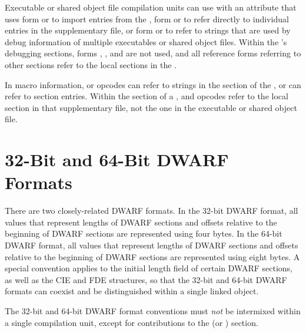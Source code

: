 Executable or shared object file compilation units can use
\DWTAGimportedunit{} with an
\DWATimport{} attribute that uses form \DWFORMrefsupfour{} or \DWFORMrefsupeight{} 
to import entries from the , 
\bb
form \DWFORMrefsupfour{} or \DWFORMrefsupeight{} 
\eb
to refer directly to individual entries in the supplementary file, or
\bb
form \DWFORMstrpsup{} or \DWFORMstrpsupeight{} 
\eb
to refer to strings that are used by debug information of multiple
executables or shared object files.  Within the 's
debugging sections, forms \DWFORMrefsupfour{}, 
\bb
\DWFORMrefsupeight{}, \DWFORMstrpsup{} and \DWFORMstrpsupeight{}
\eb
are not used, and all reference forms referring to \db other sections
refer to the local sections in the .

In macro information, \DWMACROdefinesup{} or
\DWMACROundefsup{} opcodes can refer to strings in the 
\dotdebugstr{} section of the , 
or \DWMACROimportsup{} 
can refer to \dotdebugmacro{} section entries.  Within the 
\dotdebugmacro{} section of a , 
\DWMACROdefinestrp{} and \DWMACROundefstrp{}
opcodes refer to the local \dotdebugstr{} section in that
supplementary file, not the one in
the executable or shared object file.


\section{32-Bit and 64-Bit DWARF Formats}
\label{datarep:32bitand64bitdwarfformats}
\hypertarget{datarep:xxbitdwffmt}{}
There are two closely-related DWARF
formats. In the 32-bit DWARF
format, all values that represent lengths of DWARF sections
and offsets relative to the beginning of DWARF sections are
represented using four bytes. In the 64-bit DWARF format, all
values that represent lengths of DWARF sections and offsets
relative to the beginning of DWARF sections are represented
using eight bytes. A special convention applies to the initial
length field of certain DWARF sections, as well as the CIE and
FDE structures, so that the 32-bit and 64-bit DWARF formats
can coexist and be distinguished within a single linked object.

\bb
The 32-bit and 64-bit DWARF format conventions must \emph{not} be
intermixed within a single compilation 
\bb
unit, except for contributions to the \dotdebugstroffsets{} 
(or \dotdebugstroffsetsdwo) section.
\eb

